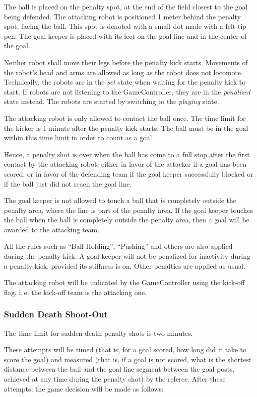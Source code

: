 \documentclass[12pt]{article}
\newcommand{\ie}{\mbox{i.\,e.}\xspace}
\begin{document}
The ball is placed on the penalty spot, at the end of the field closest to the goal being defended. The attacking robot is positioned 1 meter behind the penalty spot, facing the ball.  This spot is denoted with a small dot made with a felt-tip pen. The goal keeper is placed with its feet on the goal line and in the center of the goal.

Neither robot shall move their legs before the penalty kick starts. Movements of the robot's head and arms are allowed as long as the robot does not locomote. Technically, the robots are in the \emph{set} state when waiting for the penalty kick to start. If robots are not listening to the GameController, they are in the \emph{penalized} state instead. The robots are started by switching to the \emph{playing} state.

The attacking robot is only allowed to contact the ball once.  The time limit for the kicker is 1 minute after the penalty kick starts. The ball must be in the goal within this time limit in order to count as a goal.

Hence, a penalty shot is over when the ball has come to a full stop after the first contact by the attacking robot, either in favor of the attacker if a goal has been scored, or in favor of the defending team if the goal keeper successfully blocked or if the ball just did not reach the goal line.

The goal keeper is not allowed to touch a ball that is completely outside the penalty area, where the line is part of the penalty area. If the goal keeper touches the ball when the ball is completely outside the penalty area, then a goal will be awarded to the attacking team.

All the rules such as ``Ball Holding'', ``Pushing'' and others are also applied during the penalty kick.  A goal keeper will not be penalized for inactivity during a penalty kick, provided its stiffness is on. Other penalties are applied as usual.

The attacking robot will be indicated by the GameController using the kick-off flag, \ie the kick-off team is the attacking one.

\subsubsection{Sudden Death Shoot-Out}

The time limit for sudden death penalty shots is two minutes.

These attempts will be timed (that is, for a goal scored, how long did it take to score the goal) and measured (that is, if a goal is not scored, what is the shortest distance between the ball and the goal line segment between the goal posts, achieved at any time during the penalty shot) by the referee. After these attempts, the game decision will be made as follows:
\end{document}
